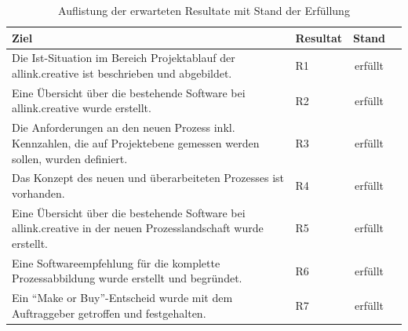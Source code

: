 \begin{table}[htbp]
\begin{center}
    \begin{tabular}{p{10cm}lcl}
        \toprule \textbf{Ziel} & \textbf{Resultat} & \textbf{Stand} \\
        \midrule Die Ist-Situation im Bereich Projektablauf der allink.creative
            ist beschrieben und abgebildet. & R1 & erfüllt \\
        \midrule Eine Übersicht über die bestehende Software bei allink.creative
            wurde erstellt. & R2 & erfüllt \\
        \midrule Die Anforderungen an den neuen Prozess inkl. Kennzahlen, die auf 
            Projektebene gemessen werden sollen, wurden definiert. & R3 
            & erfüllt \\
        \midrule Das Konzept des neuen und überarbeiteten Prozesses ist 
            vorhanden. & R4 & erfüllt \\
        \midrule Eine Übersicht über die bestehende Software bei allink.creative
            in der neuen Prozesslandschaft wurde erstellt. & R5 & erfüllt \\
        \midrule Eine Softwareempfehlung für die komplette Prozessabbildung
            wurde erstellt und begründet. & R6 & erfüllt \\
        \midrule Ein ``Make or Buy''-Entscheid wurde mit dem Auftraggeber 
            getroffen und festgehalten. & R7 & erfüllt \\
        \bottomrule
    \end{tabular}
    \caption{Auflistung der erwarteten Resultate mit Stand der Erfüllung}
    \label{tab:erreichte_ziele}
\end{center}
\end{table}